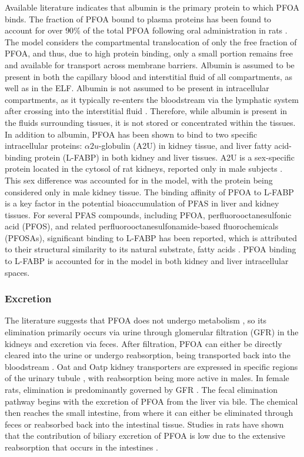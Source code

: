 \documentclass[preprint,12pt,authoryear]{elsarticle}
\begin{document}
Available literature indicates that albumin is the primary protein to which PFOA binds. The fraction of PFOA bound to plasma proteins has been found to account for over $90\%$ of the total PFOA following oral administration in rats \citep{han_2003}. The model considers the compartmental translocation of only the free fraction of PFOA, and thus, due to high protein binding, only a small portion remains free and available for transport across membrane barriers. Albumin is assumed to be present in both the capillary blood and interstitial fluid of all compartments, as well as in the ELF. Albumin is not assumed to be present in intracellular compartments, as it typically re-enters the bloodstream via the lymphatic system after crossing into the interstitial fluid \citep{moman_2022}. Therefore, while albumin is present in the fluids surrounding tissues, it is not stored or concentrated within the tissues. In addition to albumin, PFOA has been shown to bind to two specific intracellular proteins: $\alpha 2 u$-globulin (A2U) in kidney tissue, and liver fatty acid-binding protein (L-FABP) in both kidney and liver tissues. A2U  is a sex-specific protein located in the cytosol of rat kidneys, reported only in male subjects \citep{stonard_1986}. This sex difference was accounted for in the model, with the protein being considered only in male kidney tissue. The binding affinity of PFOA to L-FABP is a key factor in the potential bioaccumulation of PFAS in liver and kidney tissues. For several PFAS compounds, including PFOA, perfluorooctanesulfonic acid (PFOS), and related perfluorooctanesulfonamide-based fluorochemicals (PFOSAs), significant binding to L-FABP has been reported, which is attributed to their structural similarity to its natural substrate, fatty acids \citep{zhao_2023}. PFOA binding to L-FABP is accounted for in the model in both kidney and liver intracellular spaces. 

\subsubsection{Excretion}

The literature suggests that PFOA does not undergo metabolism \citep{atsdr_2021}, so its elimination primarily occurs via urine through glomerular filtration (GFR) in the kidneys and excretion via feces. After filtration, PFOA can either be directly cleared into the urine or undergo reabsorption, being transported back into the bloodstream \citep{efsa_2018}. Oat and Oatp kidney transporters are expressed in specific regions of the urinary tubule \citep{zhang_2021}, with reabsorption being more active in males. In female rats, elimination is predominantly governed by GFR \citep{loccisano_2012, worley_2015}. The fecal elimination pathway begins with the excretion of PFOA from the liver via bile. The chemical then reaches the small intestine, from where it can either be eliminated through feces or reabsorbed back into the intestinal tissue. Studies in rats have shown that the contribution of biliary excretion of PFOA is low due to the extensive reabsorption that occurs in the intestines \citep{atsdr_2015}.  
\end{document}

